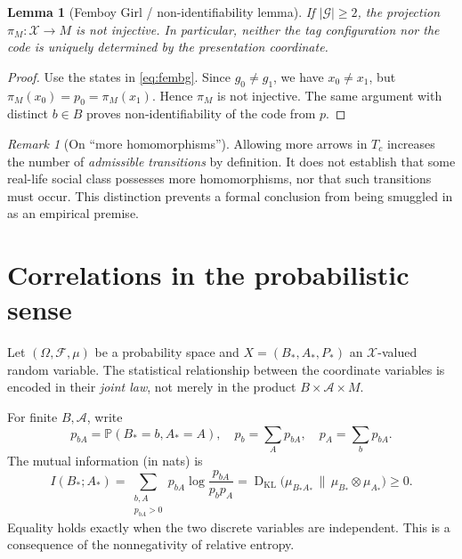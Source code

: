 \documentclass[11pt,a4paper]{article}
\numberwithin{equation}{section}
\newtheorem{lemma}[definition]{Lemma}
\theoremstyle{remark}
\newtheorem{remark}[definition]{Remark}
\newcommand{\Prob}{\mathbb{P}}
\newcommand{\G}{\mathcal{G}}
\newcommand{\A}{\mathcal{A}}
\newcommand{\X}{\mathcal{X}}
\newcommand{\1}{\mathbf{1}}
\newcommand{\KL}{\operatorname{D}_{\mathrm{KL}}}
\begin{document}
\begin{lemma}[Femboy Girl / non-identifiability lemma]\label{lem:fg}
If $|\G|\ge2$, the projection $\pi_M:\X\to M$ is not injective.
In particular, neither the tag configuration nor the code is uniquely
determined by the presentation coordinate.
\end{lemma}
\begin{proof}
Use the states in \eqref{eq:fembg}.  Since $g_0\ne g_1$,
we have $x_0\ne x_1$, but
$\pi_M(x_0)=p_0=\pi_M(x_1)$.  Hence $\pi_M$ is not injective.
The same argument with distinct $b\in B$ proves non-identifiability
of the code from $p$.
\end{proof}

\begin{center}
\end{center}

\begin{remark}[On ``more homomorphisms'']
Allowing more arrows in $T_c$ increases the number of \emph{admissible
transitions} by definition.  It does not establish that some real-life
social class possesses more homomorphisms, nor that such transitions
must occur.  This distinction prevents a formal conclusion from being
smuggled in as an empirical premise.
\end{remark}

\section{Correlations in the probabilistic sense}

Let $(\Omega,\mathcal F,\mu)$ be a probability space and
$X=(B_*,A_*,P_*)$ an $\X$-valued random variable.
The statistical relationship between the coordinate variables is
encoded in their \emph{joint law}, not merely in the product
$B\times\A\times M$.

For finite $B,\A$, write
\begin{equation}
p_{bA}=\Prob(B_*=b,A_*=A),\quad
p_b=\sum_Ap_{bA},\quad p_A=\sum_bp_{bA}.
\end{equation}
The mutual information (in nats) is
\begin{equation}\label{eq:mi}
I(B_*;A_*)=
\sum_{\substack{b,A\\p_{bA}>0}}
 p_{bA}\log\frac{p_{bA}}{p_bp_A}
=\KL\!\bigl(\mu_{B_*A_*}\,\|\,\mu_{B_*}\otimes\mu_{A_*}\bigr)
\ge0.
\end{equation}
Equality holds exactly when the two discrete variables are independent.
This is a consequence of the nonnegativity of relative entropy.
\end{document}
